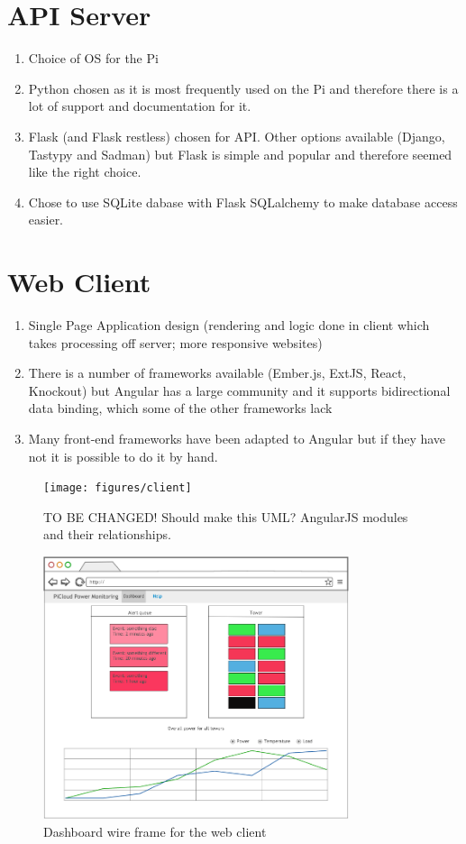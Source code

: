 \documentclass{l4proj}
\begin{document}
\section{API Server}
\begin{enumerate}
	\item Choice of OS for the Pi
	\item Python chosen as it is most frequently used on the Pi and therefore there is a lot of support and documentation for it.
	\item Flask (and Flask restless) chosen for API. Other options available (Django, Tastypy and Sadman) but Flask is simple and popular and therefore seemed like the right choice.
	\item Chose to use SQLite dabase with Flask SQLalchemy to make database access easier.
\end{enumerate}
\section{Web Client}
\begin{enumerate}
	\item Single Page Application design (rendering and logic done in client which takes processing off server; more responsive websites)
	\item There is a number of frameworks available (Ember.js, ExtJS, React, Knockout) but Angular has a large community and it supports bidirectional data binding, which some of the other frameworks lack
	\item Many front-end frameworks have been adapted to Angular but if they have not it is possible to do it by hand.
\end{enumerate}
\begin{figure}[!ht]
  \caption{TO BE CHANGED! Should make this UML? AngularJS modules and their relationships.}
  \centering
    \texttt{[image: figures/client]}
\end{figure}
\begin{figure}[!ht]
  \caption{Dashboard wire frame for the web client}
  \centering
    \includegraphics[width=0.8\textwidth]{figures/v2_dashboard}
\end{figure}
\end{document}
